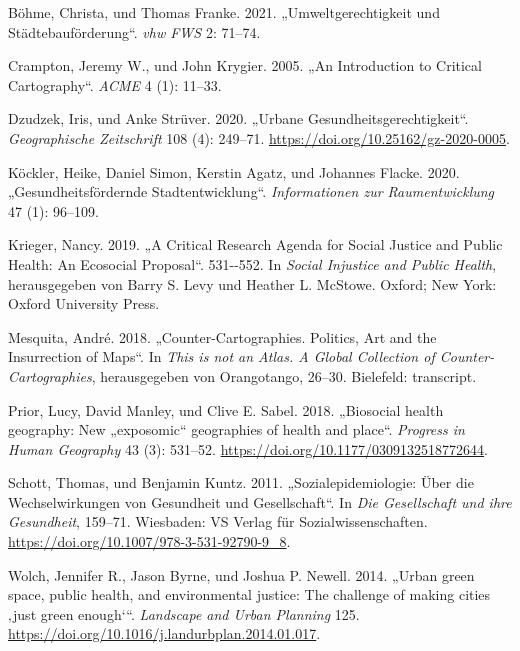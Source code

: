\documentclass[
  ngerman,
]{article}
\newlength{\cslhangindent}
\newlength{\cslentryspacingunit} %
\newenvironment{CSLReferences}[2] %
 {%
  \setlength{\parindent}{0pt}
  \ifodd #1
  \let\oldpar\par
  \def\par{\hangindent=\cslhangindent\oldpar}
  \fi
  \setlength{\parskip}{#2\cslentryspacingunit}
 }%
 {}
\begin{document}
\hypertarget{refs}{}
\begin{CSLReferences}{1}{0}
\leavevmode{}%
Böhme, Christa, und Thomas Franke. 2021. {„Umweltgerechtigkeit und St{ä}dtebauf{ö}rderung``}. \emph{vhw FWS} 2: 71--74.

\leavevmode{}%
Crampton, Jeremy W., und John Krygier. 2005. {„An Introduction to Critical Cartography``}. \emph{ACME} 4 (1): 11--33.

\leavevmode{}%
Dzudzek, Iris, und Anke Strüver. 2020. {„Urbane Gesundheitsgerechtigkeit``}. \emph{Geographische Zeitschrift} 108 (4): 249--71. \url{https://doi.org/10.25162/gz-2020-0005}.

\leavevmode{}%
Köckler, Heike, Daniel Simon, Kerstin Agatz, und Johannes Flacke. 2020. {„Gesundheitsf{ö}rdernde Stadtentwicklung``}. \emph{Informationen zur Raumentwicklung} 47 (1): 96--109.

\leavevmode{}%
Krieger, Nancy. 2019. {„A Critical Research Agenda for Social Justice and Public Health: An Ecosocial Proposal``}. 531-\/-552. In \emph{Social Injustice and Public Health}, herausgegeben von Barry S. Levy und Heather L. McStowe. Oxford; New York: Oxford University Press.

\leavevmode{}%
Mesquita, André. 2018. {„Counter-Cartographies. Politics, Art and the Insurrection of Maps``}. In \emph{This is not an Atlas. A Global Collection of Counter-Cartographies}, herausgegeben von Orangotango, 26--30. Bielefeld: transcript.

\leavevmode{}%
Prior, Lucy, David Manley, und Clive E. Sabel. 2018. {„Biosocial health geography: New „exposomic`` geographies of health and place``}. \emph{Progress in Human Geography} 43 (3): 531--52. \url{https://doi.org/10.1177/0309132518772644}.

\leavevmode{}%
Schott, Thomas, und Benjamin Kuntz. 2011. {„Sozialepidemiologie: {Ü}ber die Wechselwirkungen von Gesundheit und Gesellschaft``}. In \emph{Die Gesellschaft und ihre Gesundheit}, 159--71. Wiesbaden: {VS} Verlag f{ü}r Sozialwissenschaften. \url{https://doi.org/10.1007/978-3-531-92790-9_8}.

\leavevmode{}%
Wolch, Jennifer R., Jason Byrne, und Joshua P. Newell. 2014. {„Urban green space, public health, and environmental justice: The challenge of making cities {‚just green enough`}``}. \emph{Landscape and Urban Planning} 125. \url{https://doi.org/10.1016/j.landurbplan.2014.01.017}.

\end{CSLReferences}
\end{document}
